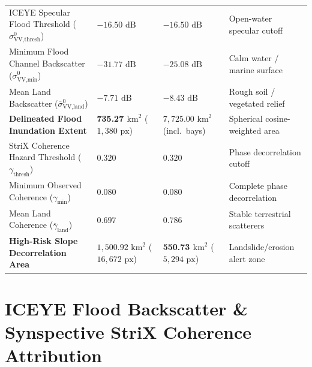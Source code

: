 \documentclass[10pt,twocolumn,letterpaper]{article}
\begin{document}
\begin{table}[t]
\begin{tabularx}{\textwidth}{>{\raggedright\arraybackslash}X >{\centering\arraybackslash}p{3.4cm} >{\centering\arraybackslash}p{3.4cm} >{\raggedright\arraybackslash}p{3.9cm}}
\midrule
ICEYE Specular Flood Threshold ($\sigma^0_{\text{VV,thresh}}$) & $-16.50\text{ dB}$ & $-16.50\text{ dB}$ & Open-water specular cutoff \\
Minimum Flood Channel Backscatter ($\sigma^0_{\text{VV,min}}$) & $-31.77\text{ dB}$ & $-25.08\text{ dB}$ & Calm water / marine surface \\
Mean Land Backscatter ($\overline{\sigma}^0_{\text{VV,land}}$) & $-7.71\text{ dB}$ & $-8.43\text{ dB}$ & Rough soil / vegetated relief \\
\textbf{Delineated Flood Inundation Extent} & \textbf{735.27 $\text{km}^2$} ($1,380\text{ px}$) & $7,725.00\text{ km}^2$ (incl.\ bays) & Spherical cosine-weighted area \\
\midrule
StriX Coherence Hazard Threshold ($\gamma_{\text{thresh}}$) & $0.320$ & $0.320$ & Phase decorrelation cutoff \\
Minimum Observed Coherence ($\gamma_{\text{min}}$) & $0.080$ & $0.080$ & Complete phase decorrelation \\
Mean Land Coherence ($\overline{\gamma}_{\text{land}}$) & $0.697$ & $0.786$ & Stable terrestrial scatterers \\
\textbf{High-Risk Slope Decorrelation Area} & $1,500.92\text{ km}^2$ ($16,672\text{ px}$) & \textbf{550.73 $\text{km}^2$} ($5,294\text{ px}$) & Landslide/erosion alert zone \\
\bottomrule
\end{tabularx}
\end{table}

\section{ICEYE Flood Backscatter \& Synspective StriX Coherence Attribution}
\end{document}
